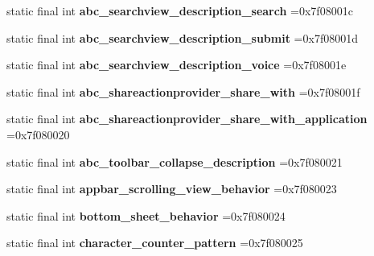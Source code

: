 \begin{DoxyCompactItemize}
static final int {\bfseries abc\+\_\+searchview\+\_\+description\+\_\+search} =0x7f08001c
\item 
\mbox{\label{classproject4_1_1xaria_1_1R_1_1string_aa020a14cb40e86976e244772e8068ae6}} 
static final int {\bfseries abc\+\_\+searchview\+\_\+description\+\_\+submit} =0x7f08001d
\item 
\mbox{\label{classproject4_1_1xaria_1_1R_1_1string_a5693f67a182d9c2fac531371d69ef542}} 
static final int {\bfseries abc\+\_\+searchview\+\_\+description\+\_\+voice} =0x7f08001e
\item 
\mbox{\label{classproject4_1_1xaria_1_1R_1_1string_a7410dd5b15050944498854a69172369e}} 
static final int {\bfseries abc\+\_\+shareactionprovider\+\_\+share\+\_\+with} =0x7f08001f
\item 
\mbox{\label{classproject4_1_1xaria_1_1R_1_1string_aaff8a68a3cfdd3b2027e27aba0ffb186}} 
static final int {\bfseries abc\+\_\+shareactionprovider\+\_\+share\+\_\+with\+\_\+application} =0x7f080020
\item 
\mbox{\label{classproject4_1_1xaria_1_1R_1_1string_a0e95754444ece2d7247f73945ec64e7c}} 
static final int {\bfseries abc\+\_\+toolbar\+\_\+collapse\+\_\+description} =0x7f080021
\item 
\mbox{\label{classproject4_1_1xaria_1_1R_1_1string_ae999a5edf9892d6f2c142178d3cb7af4}} 
static final int {\bfseries appbar\+\_\+scrolling\+\_\+view\+\_\+behavior} =0x7f080023
\item 
\mbox{\label{classproject4_1_1xaria_1_1R_1_1string_a74d94199f96f7b99d54310013e4d4aa6}} 
static final int {\bfseries bottom\+\_\+sheet\+\_\+behavior} =0x7f080024
\item 
\mbox{\label{classproject4_1_1xaria_1_1R_1_1string_a002b76f2e1443355c5430dcaaf5fc37f}} 
static final int {\bfseries character\+\_\+counter\+\_\+pattern} =0x7f080025
\item 

\end{DoxyCompactItemize}
